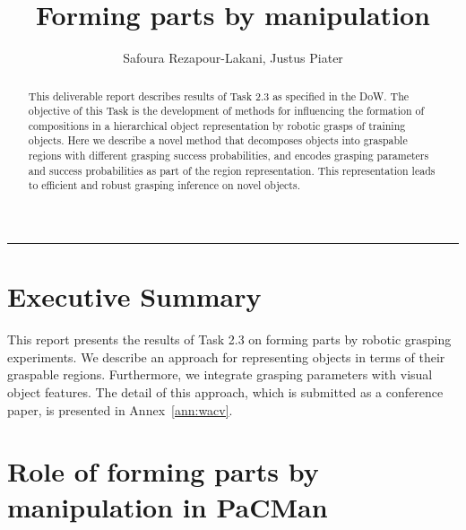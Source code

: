 \documentclass[a4paper,11pt,pdf]{pacmanreport}
\title{Forming parts by manipulation}
\author{Safoura Rezapour-Lakani, Justus Piater}
\begin{document}
\maketitle

\begin{abstract}
\noindent 
This deliverable report describes results of Task 2.3 as specified in
the DoW.  The objective of this Task is the development of methods for
influencing the formation of compositions in a hierarchical object
representation by robotic grasps of training objects.  Here we
describe a novel method that decomposes objects into graspable
regions with different grasping success probabilities,
and encodes grasping parameters and success probabilities as part of
the region representation. This representation leads to efficient and
robust grasping inference on novel objects.

\end{abstract}


\vspace{.2em}
\hrule

\footnotesize

\tableofcontents

\normalsize

\newpage

\section*{Executive Summary}


This report presents the results of Task 2.3 on forming parts by
robotic grasping experiments. We describe an approach for representing
objects in terms of their graspable regions. Furthermore, we integrate
grasping parameters with visual object features. The detail of this
approach, which is submitted as a conference paper, is presented in
Annex~\ref{ann:wacv}.

\section*{Role of forming parts by manipulation in PaCMan}
\end{document}
